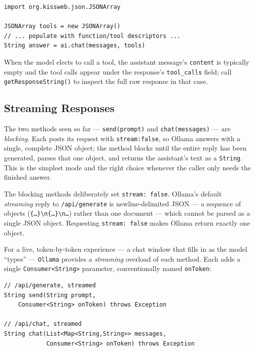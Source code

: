 \begin{lstlisting}[style=groovy]
import org.kissweb.json.JSONArray

JSONArray tools = new JSONArray()
// ... populate with function/tool descriptors ...
String answer = ai.chat(messages, tools)
\end{lstlisting}

\noindent
When the model elects to call a tool, the assistant message's \texttt{content} is typically empty and the tool calls appear under the response's \texttt{tool\_calls} field; call \texttt{getResponseString()} to inspect the full raw response in that case.

\subsection{Streaming Responses}
\label{sec:llm-ollama-streaming}

The two methods seen so far --- \texttt{send(prompt)} and \texttt{chat(}\allowbreak\texttt{messages)} --- are \emph{blocking}.  Each posts its request with \texttt{stream:}\hspace{0.3em}\texttt{false}, so Ollama answers with a single, complete JSON object; the method blocks until the entire reply has been generated, parses that one object, and returns the assistant's text as a \texttt{String}.  This is the simplest mode and the right choice whenever the caller only needs the finished answer.

\begin{notebox}
The blocking methods deliberately set \texttt{stream:\ false}.  Ollama's default \emph{streaming} reply to \texttt{/api/generate} is newline-delimited JSON --- a sequence of objects (\texttt{\{\dots\}\textbackslash n\{\dots\}\textbackslash n\dots}) rather than one document --- which cannot be parsed as a single JSON object.  Requesting \texttt{stream:\ false} makes Ollama return exactly one object.
\end{notebox}

\noindent
For a live, token-by-token experience --- a chat window that fills in as the model ``types'' --- \texttt{Ollama} provides a \emph{streaming} overload of each method.  Each adds a single \texttt{Consumer<String>} parameter, conventionally named \texttt{onToken}:

\begin{lstlisting}[style=java]
// /api/generate, streamed
String send(String prompt,
    Consumer<String> onToken) throws Exception

// /api/chat, streamed
String chat(List<Map<String,String>> messages,
            Consumer<String> onToken) throws Exception
\end{lstlisting}

